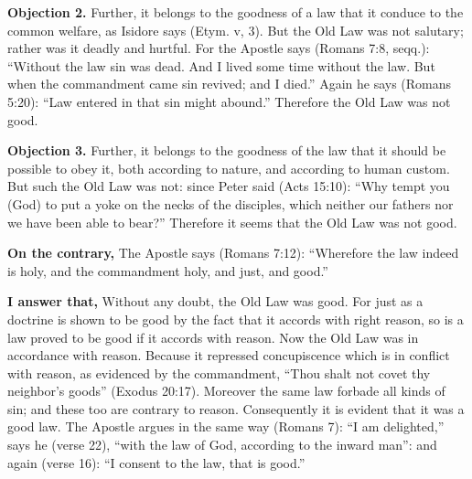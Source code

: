 \textbf{Objection 2.} Further, it belongs to the goodness of a law that it conduce to the common welfare, as Isidore says (Etym. v, 3). But the Old Law was not salutary; rather was it deadly and hurtful. For the Apostle says (Romans 7:8, seqq.): ``Without the law sin was dead. And I lived some time without the law. But when the commandment came sin revived; and I died.'' Again he says (Romans 5:20): ``Law entered in that sin might abound.'' Therefore the Old Law was not good.

\textbf{Objection 3.} Further, it belongs to the goodness of the law that it should be possible to obey it, both according to nature, and according to human custom. But such the Old Law was not: since Peter said (Acts 15:10): ``Why tempt you (God) to put a yoke on the necks of the disciples, which neither our fathers nor we have been able to bear?'' Therefore it seems that the Old Law was not good.

\textbf{On the contrary,} The Apostle says (Romans 7:12): ``Wherefore the law indeed is holy, and the commandment holy, and just, and good.''

\textbf{I answer that,} Without any doubt, the Old Law was good. For just as a doctrine is shown to be good by the fact that it accords with right reason, so is a law proved to be good if it accords with reason. Now the Old Law was in accordance with reason. Because it repressed concupiscence which is in conflict with reason, as evidenced by the commandment, ``Thou shalt not covet thy neighbor's goods'' (Exodus 20:17). Moreover the same law forbade all kinds of sin; and these too are contrary to reason. Consequently it is evident that it was a good law. The Apostle argues in the same way (Romans 7): ``I am delighted,'' says he (verse 22), ``with the law of God, according to the inward man'': and again (verse 16): ``I consent to the law, that is good.''

